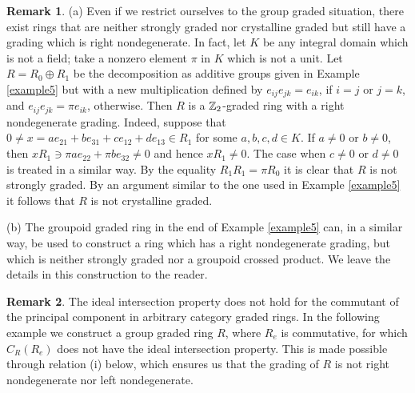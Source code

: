 \documentclass[11pt,leqno]{amsart}
\theoremstyle{plain}
\theoremstyle{definition}
\newtheorem{rem}{Remark}
\begin{document}
\begin{rem}
(a) Even if we restrict ourselves to the group graded situation,
there exist rings that are neither strongly graded nor
crystalline graded but still have a grading which is right nondegenerate.
In fact, let $K$ be any integral domain which is not a field;
take a nonzero element $\pi$ in $K$ which is not a unit.
Let $R = R_0 \oplus R_1$ be the decomposition as additive groups
given in Example \ref{example5} but with a new multiplication defined
by $e_{ij} e_{jk} = e_{ik}$, if $i=j$ or $j=k$, and
$e_{ij}e_{jk} = \pi e_{ik}$, otherwise.
Then $R$ is a ${\Bbb Z}_2$-graded ring
with a right nondegenerate grading. Indeed, suppose that
$0 \neq x = ae_{21} + be_{31} + ce_{12} + de_{13} \in R_1$
for some $a,b,c,d \in K$.
If $a \neq 0$ or $b \neq 0$, then $xR_1 \ni \pi a e_{22} + \pi b e_{32} \neq 0$
and hence $x R_1 \neq 0$.
The case when $c \neq 0$ or $d \neq 0$
is treated in a similar way.
By the equality $R_1 R_1 = \pi R_0$ it is clear that
$R$ is not strongly graded.
By an argument similar to the one used in
Example \ref{example5} it follows that $R$
is not crystalline graded.

(b) The groupoid graded ring in the end
of Example \ref{example5} can, in a similar way,
be used to construct a ring which has a right nondegenerate grading,
but which is neither
strongly graded nor a groupoid crossed product.
We leave the details in this construction to the reader.
\end{rem}

\begin{rem}
The ideal intersection property does
not hold for the commutant of the principal component
in arbitrary category graded rings.
In the following example we construct a group graded ring $R$, where $R_e$ is commutative, for which $C_R(R_e)$ does not have the ideal intersection property. This is made possible through relation (i) below, which ensures us that the grading of $R$ is not right nondegenerate nor left nondegenerate.
\end{rem}
\end{document}
